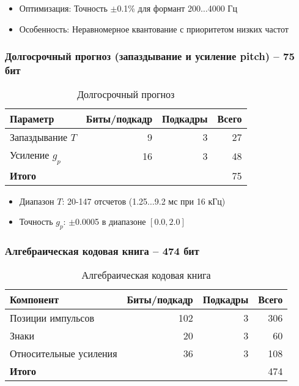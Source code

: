 \documentclass{report}
\begin{document}
	\begin{itemize}
		\item Оптимизация: Точность $\pm$0.1\% для формант 200$\ldots$4000 Гц
		\item Особенность: Неравномерное квантование с приоритетом низких частот
	\end{itemize}

	\subsubsection{Долгосрочный прогноз (запаздывание и усиление pitch) -- 75 бит}
	\begin{table}[H]
		\centering
		\caption{Долгосрочный прогноз}
		\begin{tabular}{lrrr}
			\toprule
				\textbf{Параметр} & \textbf{Биты/подкадр} & \textbf{Подкадры} & \textbf{Всего} \\
			\midrule
				Запаздывание $T$ & 9 & 3 & 27 \\
				Усиление $g_p$ & 16 & 3 & 48 \\
			\bottomrule
				\textbf{Итого} & & & 75 \\
			\bottomrule
		\end{tabular}
	\end{table}
	
	\begin{itemize}
		\item Диапазон $T$: 20-147 отсчетов (1.25$\ldots$9.2 мс при 16 кГц)
		\item Точность $g_p$: $\pm$0.0005 в диапазоне $[0.0, 2.0]$
	\end{itemize}

	\subsubsection{Алгебраическая кодовая книга -- 474 бит}
	\begin{table}[H]
		\centering
		\caption{Алгебраическая кодовая книга}
		\begin{tabular}{lrrr}
			\toprule
				\textbf{Компонент} & \textbf{Биты/подкадр} & \textbf{Подкадры} & \textbf{Всего} \\
			\midrule
				Позиции импульсов & 102 & 3 & 306 \\
				Знаки & 20 & 3 & 60 \\
				Относительные усиления & 36 & 3 & 108 \\
			\bottomrule
				\textbf{Итого} & & & 474 \\
			\bottomrule
		\end{tabular}
	\end{table}
\end{document}
